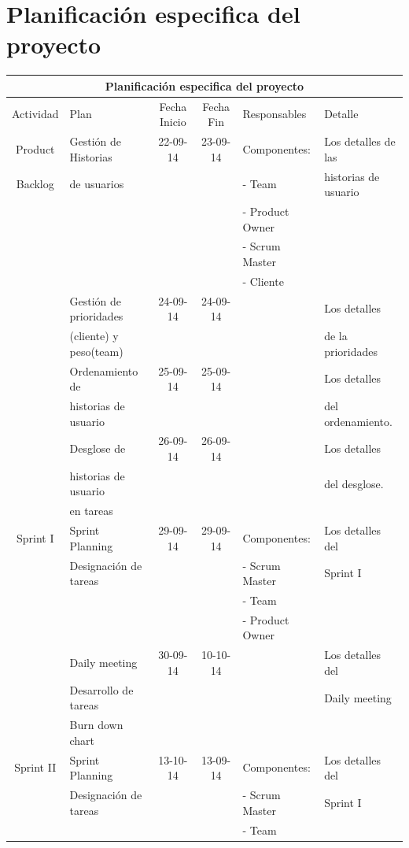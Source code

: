 \documentclass[11pt,letterpaper]{report}
\begin{document}
\section{Planificación especifica del proyecto}
\begin{tabular}{|c|p{4cm}|c|c|l|p{3cm}|}
	\hline
	\multicolumn{6}{|c|}{Planificación especifica del proyecto} \\ \hline
	Actividad & Plan & Fecha Inicio & Fecha Fin & Responsables & Detalle \\ \hline
	Product & Gestión de Historias  & 22-09-14 & 23-09-14 & Componentes: & Los detalles de las \\
	Backlog & de usuarios&&& - Team & historias de usuario\\
	&&&& - Product Owner & \\
	&&&& - Scrum Master & \\
	&&&& - Cliente & \\
	\cline{2-4} \cline{6-6}
	& Gestión de prioridades& 24-09-14 & 24-09-14 && Los detalles  \\ 
	& (cliente) y peso(team)&&&&de la prioridades\\ 
	\cline{2-4} \cline{6-6}
	& Ordenamiento de & 25-09-14 & 25-09-14 && Los detalles \\
	& historias de usuario & &&& del ordenamiento. \\
	\cline{2-4} \cline{6-6}
	& Desglose de& 26-09-14 & 26-09-14 && Los detalles \\
	& historias de usuario & &&& del desglose. \\
	& en tareas &&&& \\
	\hline %
	Sprint I& Sprint Planning & 29-09-14 & 29-09-14 &  Componentes: & Los detalles del \\
	& Designación de tareas &  &  & - Scrum Master & Sprint I \\
	& & & & - Team & \\
	& & & & - Product Owner & \\
	\cline{2-4} \cline{6-6}
	& Daily meeting & 30-09-14 & 10-10-14 & & Los detalles del  \\ 
	& Desarrollo de tareas &&&& Daily meeting\\
	& Burn down chart &&&& \\
	\hline %
	Sprint II& Sprint Planning & 13-10-14 & 13-09-14 &  Componentes: & Los detalles del \\
	& Designación de tareas &  &  & - Scrum Master & Sprint I \\
	& & & & - Team & \\

\end{tabular}
\end{document}
